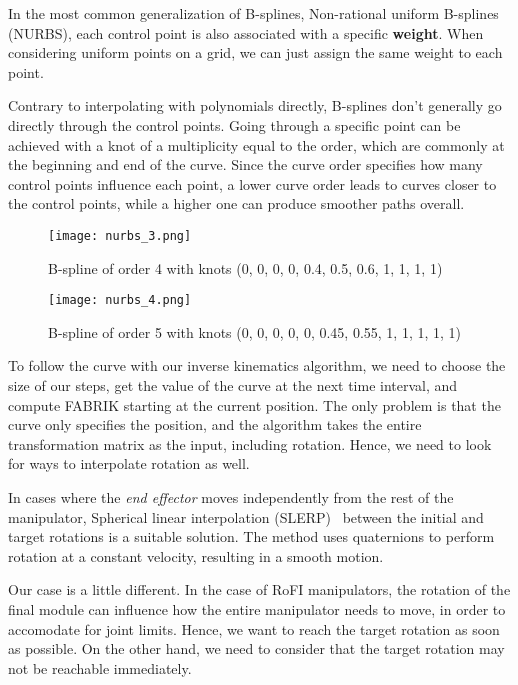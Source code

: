 In the most common generalization of B-splines, Non-rational uniform B-splines (NURBS), each control point is also associated with a specific \textbf{weight}. When considering uniform points on a grid, we can just assign the same weight to each point.

Contrary to interpolating with polynomials directly, B-splines don't generally go directly through the control points. Going through a specific point can be achieved with a knot of a multiplicity equal to the order, which are commonly at the beginning and end of the curve. Since the curve order specifies how many control points influence each point, a lower curve order leads to curves closer to the control points, while a higher one can produce smoother paths overall.

\begin{figure}
  \centering
  \texttt{[image: nurbs\_3.png]}
  \caption{B-spline of order 4 with knots (0, 0, 0, 0, 0.4, 0.5, 0.6, 1, 1, 1, 1)}
\end{figure}

\begin{figure}
  \centering
  \texttt{[image: nurbs\_4.png]}
  \caption{B-spline of order 5 with knots (0, 0, 0, 0, 0, 0.45, 0.55, 1, 1, 1, 1, 1)}
\end{figure}

To follow the curve with our inverse kinematics algorithm, we need to choose the size of our steps, get the value of the curve at the next time interval, and compute FABRIK starting at the current position. The only problem is that the curve only specifies the position, and the algorithm takes the entire transformation matrix as the input, including rotation. Hence, we need to look for ways to interpolate rotation as well.

In cases where the \textit{end effector} moves independently from the rest of the manipulator, Spherical linear interpolation (SLERP)~\cite{slerp} between the initial and target rotations is a suitable solution. The method uses quaternions to perform rotation at a constant velocity, resulting in a smooth motion.

Our case is a little different. In the case of RoFI manipulators, the rotation of the final module can influence how the entire manipulator needs to move, in order to accomodate for joint limits. Hence, we want to reach the target rotation as soon as possible. On the other hand, we need to consider that the target rotation may not be reachable immediately.

